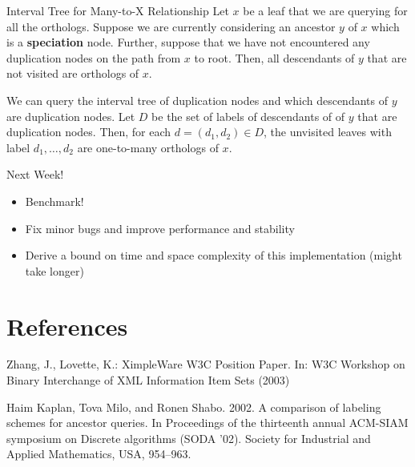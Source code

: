 \documentclass{beamer}
\begin{document}
\begin{frame}{Interval Tree for Many-to-X Relationship}
    Let $x$ be a leaf that we are querying for all the orthologs. Suppose we are currently considering an ancestor $y$ of $x$ which is a \textbf{speciation} node. Further, suppose that we have not encountered any duplication nodes on the path from $x$ to root. Then, all descendants of $y$ that are not visited are orthologs of $x$. 
    
    We can query the interval tree of duplication nodes and which descendants of $y$ are duplication nodes. Let $D$ be the set of labels of descendants of of $y$ that are duplication nodes. Then, for each $d = (d_1,d_2) \in D$, the unvisited leaves with label $d_1,\ldots,d_2$ are one-to-many orthologs of $x$.
\end{frame}

\begin{frame}{Next Week!}
    \begin{itemize}
        \item Benchmark!
        \item Fix minor bugs and improve performance and stability
        \item Derive a bound on time and space complexity of this implementation (might take longer)
    \end{itemize}
\end{frame}

\section{References}

\begin{frame}
    \scriptsize

    Zhang, J., Lovette, K.: XimpleWare W3C Position Paper. In: W3C Workshop on Binary Interchange of XML Information Item Sets (2003)

    Haim Kaplan, Tova Milo, and Ronen Shabo. 2002. A comparison of labeling schemes for ancestor queries. In Proceedings of the thirteenth annual ACM-SIAM symposium on Discrete algorithms (SODA '02). Society for Industrial and Applied Mathematics, USA, 954–963.

\end{frame}
\end{document}
